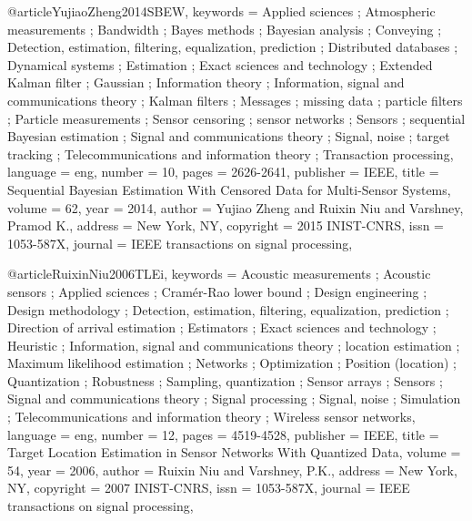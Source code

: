@article{YujiaoZheng2014SBEW,
keywords = {Applied sciences ; Atmospheric measurements ; Bandwidth ; Bayes methods ; Bayesian analysis ; Conveying ; Detection, estimation, filtering, equalization, prediction ; Distributed databases ; Dynamical systems ; Estimation ; Exact sciences and technology ; Extended Kalman filter ; Gaussian ; Information theory ; Information, signal and communications theory ; Kalman filters ; Messages ; missing data ; particle filters ; Particle measurements ; Sensor censoring ; sensor networks ; Sensors ; sequential Bayesian estimation ; Signal and communications theory ; Signal, noise ; target tracking ; Telecommunications and information theory ; Transaction processing},
language = {eng},
number = {10},
pages = {2626-2641},
publisher = {IEEE},
title = {Sequential Bayesian Estimation With Censored Data for Multi-Sensor Systems},
volume = {62},
year = {2014},
author = {Yujiao Zheng and Ruixin Niu and Varshney, Pramod K.},
address = {New York, NY},
copyright = {2015 INIST-CNRS},
issn = {1053-587X},
journal = {IEEE transactions on signal processing},
}

@article{RuixinNiu2006TLEi,
keywords = {Acoustic measurements ; Acoustic sensors ; Applied sciences ; Cramér-Rao lower bound ; Design engineering ; Design methodology ; Detection, estimation, filtering, equalization, prediction ; Direction of arrival estimation ; Estimators ; Exact sciences and technology ; Heuristic ; Information, signal and communications theory ; location estimation ; Maximum likelihood estimation ; Networks ; Optimization ; Position (location) ; Quantization ; Robustness ; Sampling, quantization ; Sensor arrays ; Sensors ; Signal and communications theory ; Signal processing ; Signal, noise ; Simulation ; Telecommunications and information theory ; Wireless sensor networks},
language = {eng},
number = {12},
pages = {4519-4528},
publisher = {IEEE},
title = {Target Location Estimation in Sensor Networks With Quantized Data},
volume = {54},
year = {2006},
author = {Ruixin Niu and Varshney, P.K.},
address = {New York, NY},
copyright = {2007 INIST-CNRS},
issn = {1053-587X},
journal = {IEEE transactions on signal processing},
}



